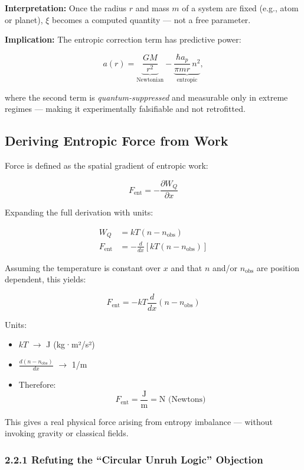 \documentclass[12pt]{article}
\begin{document}
\textbf{Interpretation:} Once the radius $r$ and mass $m$ of a system are fixed (e.g., atom or planet), $\xi$ becomes a computed quantity — not a free parameter.

\textbf{Implication:} The entropic correction term has predictive power:

\[
a(r) = \underbrace{\frac{GM}{r^2}}_{\text{Newtonian}} - \underbrace{\frac{\hbar a_p}{\pi m r} \, n^2}_{\text{entropic}},
\]

where the second term is \emph{quantum-suppressed} and measurable only in extreme regimes — making it experimentally falsifiable and not retrofitted.

\subsection{Deriving Entropic Force from Work}

Force is defined as the spatial gradient of entropic work:

\[
F_{\text{ent}} = -\frac{\partial W_Q}{\partial x}
\]

Expanding the full derivation with units:

\begin{align*}
W_Q &= kT(n - n_{\text{obs}}) \\
F_{\text{ent}} &= -\frac{d}{dx} \left[kT(n - n_{\text{obs}})\right]
\end{align*}

Assuming the temperature is constant over $x$ and that $n$ and/or $n_{\text{obs}}$ are position dependent, this yields:

\[
F_{\text{ent}} = -kT \frac{d}{dx}(n - n_{\text{obs}})
\]

Units:
\begin{itemize}
    \item $kT$ $\rightarrow$ J (kg·m²/s²)
    \item $\frac{d(n - n_{\text{obs}})}{dx}$ $\rightarrow$ 1/m
    \item Therefore:
    \[
    F_{\text{ent}} = \frac{\text{J}}{\text{m}} = \text{N (Newtons)}
    \]
\end{itemize}

This gives a real physical force arising from entropy imbalance — without invoking gravity or classical fields.

\subsubsection*{2.2.1 Refuting the “Circular Unruh Logic” Objection}
\end{document}
